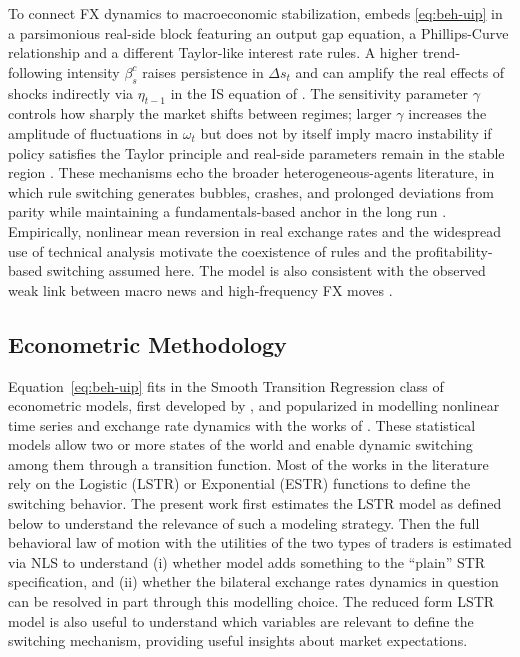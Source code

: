 \documentclass[a4paper,10pt,final]{article}    %
\begin{document}
\label{sec:real}

To connect FX dynamics to macroeconomic stabilization, \citet{Proano2011,proano2013monetary} embeds \eqref{eq:beh-uip} in a parsimonious real-side block featuring an output gap equation, a Phillips-Curve relationship and a different Taylor-like interest rate rules. A higher trend-following intensity $\beta_s^{c}$ raises persistence in $\Delta s_t$ and can amplify the real effects of shocks indirectly via $\eta_{t-1}$ in the IS equation of \citet{proano2013monetary}. The sensitivity parameter $\gamma$ controls how sharply the market shifts between regimes; larger $\gamma$ increases the amplitude of fluctuations in $\omega_t$ but does not by itself imply macro instability if policy satisfies the Taylor principle and real-side parameters remain in the stable region \citep{proano2013monetary}. These mechanisms echo the broader heterogeneous-agents literature, in which rule switching generates bubbles, crashes, and prolonged deviations from parity while maintaining a fundamentals-based anchor in the long run \citep{DeGrauwe2006,ManzanWesterhoff2007}. Empirically, nonlinear mean reversion in real exchange rates \citep{TaylorPeelSarno2001,MichaelNobayPeel1997} and the widespread use of technical analysis \citep{MenkhoffTaylor2007,ParkIrwin2007,CheungChinn2001} motivate the coexistence of rules and the profitability-based switching assumed here. The model is also consistent with the observed weak link between macro news and high-frequency FX moves \citep{EvansLyons2008,EvansLyons2002,Evans2011}.


\subsection{Econometric Methodology}
\label{chap:econometrics}

Equation~\eqref{eq:beh-uip} fits in the Smooth Transition Regression class of econometric models, first developed by \citet{GrangerTerasvirta1993,Terasvirta1994}, and popularized in modelling nonlinear time series and exchange rate dynamics with the works of \citet{TaylorPeelSarno2001,vanDijk2002,GrangerTerasvirta2010}. These statistical models allow two or more states of the world and enable dynamic switching among them through a transition function. Most of the works in the literature rely on the Logistic (LSTR) or Exponential (ESTR) functions to define the switching behavior. The present work first estimates the LSTR model as defined below to understand the relevance of such a modeling strategy. Then the full behavioral law of motion with the utilities of the two types of traders is estimated via NLS to understand (i) whether model adds something to the ``plain'' STR specification, and (ii) whether the bilateral exchange rates dynamics in question can be resolved in part through this modelling choice.
The reduced form LSTR model is also useful to understand which variables are relevant to define the switching mechanism, providing useful insights about market expectations.
\end{document}
